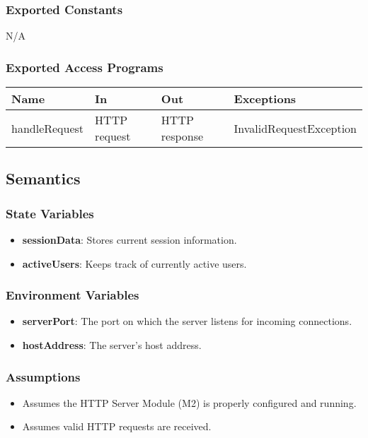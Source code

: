 \documentclass[12pt, titlepage]{article}
\begin{document}
\subsubsection{Exported Constants}
N/A
\subsubsection{Exported Access Programs}

\begin{center}
\begin{tabular}{p{2.5cm} p{3.5cm} p{3.5cm} p{3cm}}
\hline
\textbf{Name} & \textbf{In} & \textbf{Out} & \textbf{Exceptions} \\
\hline
handleRequest & HTTP request & HTTP response & InvalidRequestException \\
\hline
\end{tabular}
\end{center}
\subsection{Semantics}
\subsubsection{State Variables}
\begin{itemize}
  \item \textbf{sessionData}: Stores current session information.
  \item \textbf{activeUsers}: Keeps track of currently active users.
\end{itemize}
\subsubsection{Environment Variables}
\begin{itemize}
  \item \textbf{serverPort}: The port on which the server listens for incoming connections.
  \item \textbf{hostAddress}: The server's host address.
\end{itemize}
\subsubsection{Assumptions}
\begin{itemize}
  \item Assumes the HTTP Server Module (M2) is properly configured and running.
  \item Assumes valid HTTP requests are received.
\end{itemize}
\end{document}
